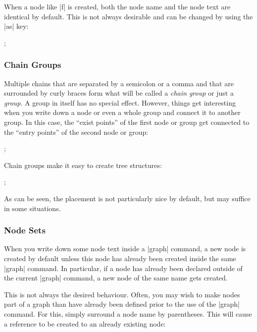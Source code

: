 When a node like |f| is created, both the node name and the node text
are identical by default. This is not always desirable and can be
changed by using the |as| key:

\begin{codeexample}[]
\tikz {};  
\end{codeexample}


\subsubsection{Chain Groups}

Multiple chains that are separated by a semicolon or a comma and that
are surrounded by curly braces form what will be called a \emph{chain
  group} or just a \emph{group}. A group in itself has no special
effect. However, things get interesting when you write down a node or
even a whole group and connect it to another group. In this case, the
``exist points'' of the first node or group get connected to the
``entry points'' of the second node or group:

\begin{codeexample}[]
\tikz {};  
\end{codeexample}

Chain groups make it easy to create tree structures:

\begin{codeexample}[]
\tikz {};
\end{codeexample}

As can be seen, the placement is not particularly nice by default, but
may suffice in some situations.


\subsubsection{Node Sets}

When you write down some node text inside a |graph| command, a new
node is created by default unless this node has already been created
inside the same |graph| command. In particular, if a node has
already been declared outside of the current |graph| command, a new
node of the same name gets created.

This is not always the desired behaviour. Often, you may wish to make
nodes part of a graph than have already been defined prior to the use
of the |graph| command. For this, simply surround a node name by
parentheses. This will cause a reference to be created to an already
existing node:

